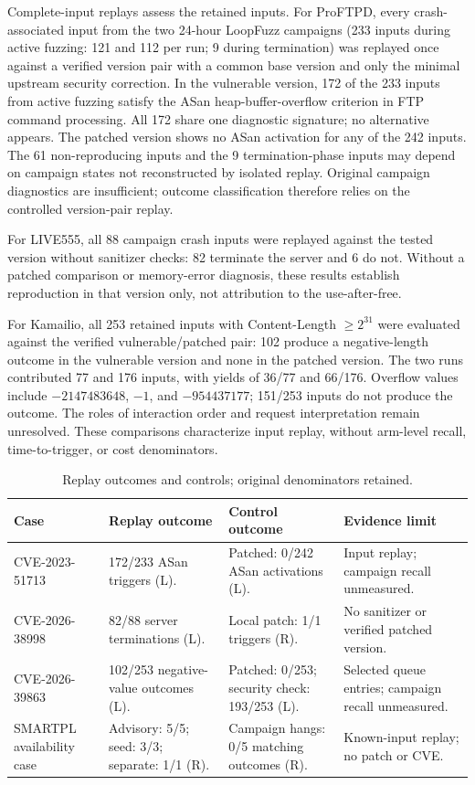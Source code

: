\documentclass[final,5p,times,number]{elsarticle}
\begin{document}
Complete-input replays assess the retained inputs. For ProFTPD, every crash-associated input from the two 24-hour LoopFuzz campaigns (233 inputs during active fuzzing: 121 and 112 per run; 9 during termination) was replayed once against a verified version pair with a common base version and only the minimal upstream security correction. In the vulnerable version, 172 of the 233 inputs from active fuzzing satisfy the ASan heap-buffer-overflow criterion in FTP command processing. All 172 share one diagnostic signature; no alternative appears. The patched version shows no ASan activation for any of the 242 inputs. The 61 non-reproducing inputs and the 9 termination-phase inputs may depend on campaign states not reconstructed by isolated replay. Original campaign diagnostics are insufficient; outcome classification therefore relies on the controlled version-pair replay.

For LIVE555, all 88 campaign crash inputs were replayed against the tested version without sanitizer checks: 82 terminate the server and 6 do not. Without a patched comparison or memory-error diagnosis, these results establish reproduction in that version only, not attribution to the use-after-free.

For Kamailio, all 253 retained inputs with Content-Length $\geq 2^{31}$ were evaluated against the verified vulnerable/patched pair: 102 produce a negative-length outcome in the vulnerable version and none in the patched version. The two runs contributed 77 and 176 inputs, with yields of 36/77 and 66/176. Overflow values include $-2147483648$, $-1$, and $-954437177$; 151/253 inputs do not produce the outcome. The roles of interaction order and request interpretation remain unresolved. These comparisons characterize input replay, without arm-level recall, time-to-trigger, or cost denominators.

\begin{table}[!tbp]
\centering\small
\caption{Replay outcomes and controls; original denominators retained.}
\label{tab:cveresults}
\begin{tabularx}{\textwidth}{@{}>{\raggedright\arraybackslash}p{} Y Y Y@{}}
\toprule
Case & Replay outcome & Control outcome & Evidence limit \\
\midrule
\mbox{CVE-2023-51713} & 172/233 ASan triggers (L). & Patched: 0/242 ASan activations (L). & Input replay; campaign recall unmeasured. \\
\addlinespace[3pt]
\mbox{CVE-2026-38998} & 82/88 server terminations (L). & Local patch: 1/1 triggers (R). & No sanitizer or verified patched version. \\
\addlinespace[3pt]
\mbox{CVE-2026-39863} & 102/253 negative-value outcomes (L). & Patched: 0/253; security check: 193/253 (L). & Selected queue entries; campaign recall unmeasured. \\
\addlinespace[3pt]
SMARTPL availability case & Advisory: 5/5; seed: 3/3; separate: 1/1 (R). & Campaign hangs: 0/5 matching outcomes (R). & Known-input replay; no patch or CVE. \\
\bottomrule
\end{tabularx}
\end{table}
\end{document}
